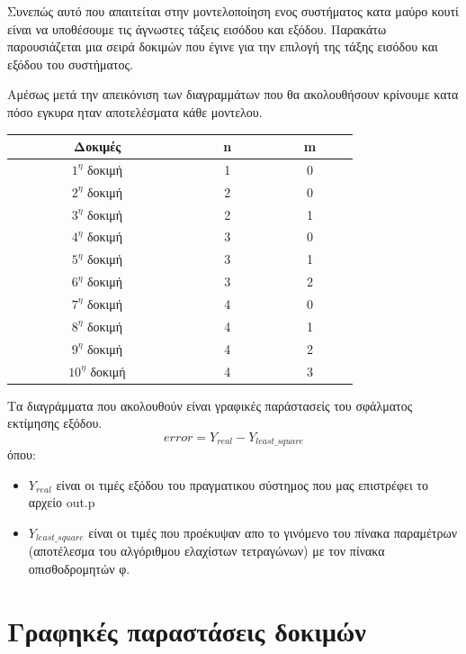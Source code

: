 \documentclass{article}
\begin{document}
Συνεπώς αυτό που απαιτείται στην μοντελοποίηση ενος συστήματος κατα μαύρο κουτί είναι να υποθέσουμε τις άγνωστες τάξεις εισόδου και εξόδου.
\clearpage
\Large {}
Παρακάτω παρουσιάζεται μια σειρά δοκιμών που έγινε για την επιλογή της τάξης εισόδου και εξόδου του συστήματος.
\par Αμέσως μετά την απεικόνιση των διαγραμμάτων που θα ακολουθήσουν κρίνουμε κατα πόσο εγκυρα ηταν αποτελέσματα κάθε μοντελου. 
\begin{center}
\begin{tabular}{ |c|c|c| } 
 \hline
$\qquad$ $\qquad$ Δοκιμές $\qquad$ $\qquad$ &$\qquad$ n $\qquad$& $\qquad$ m $\qquad$ \\ 
  \hline
 $1^{η}$ δοκιμή & 1 & 0 \\ 
  \hline
  $2^{η}$ δοκιμή & 2 & 0 \\ 
  \hline
   $3^{η}$ δοκιμή & 2 & 1 \\ 
  \hline
   $4^{η}$ δοκιμή & 3 & 0 \\ 
  \hline
   $5^{η}$ δοκιμή & 3 & 1 \\ 
  \hline
   $6^{η}$ δοκιμή & 3 & 2 \\ 
  \hline
  $7^{η}$ δοκιμή & 4 & 0 \\ 
  \hline
  $8^{η}$ δοκιμή & 4 & 1 \\ 
  \hline
  $9^{η}$ δοκιμή & 4 & 2 \\ 
  \hline
  $10^{η}$ δοκιμή & 4 & 3 \\ 
  \hline
\end{tabular}
\end{center}
\par Τα διαγράμματα που ακολουθούν είναι γραφικές παράστασείς του σφάλματος εκτίμησης εξόδου.
\begin{equation*}
error = Y_{real} - Y_{least\_square}
\end{equation*}
όπου: 
\begin{itemize}
\item $Y_{real}$ είναι οι τιμές εξόδου του πραγματικου σύστημος που μας επιστρέφει το αρχείο out.p
\item $Y_{least\_square}$ είναι οι τιμές που προέκυψαν απο το γινόμενο του πίνακα παραμέτρων (αποτέλεσμα του αλγόριθμου ελαχίστων τετραγώνων) με τον πίνακα οπισθοδρομητών φ.   
\end{itemize}
\clearpage
\large
 
\section*{Γραφηκές παραστάσεις δοκιμών}
\end{document}
